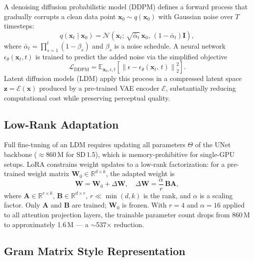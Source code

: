 \documentclass[conference]{IEEEtran}
\newcommand{\R}{\mathbb{R}}
\newcommand{\norm}[1]{\left\lVert#1\right\rVert}
\begin{document}
A denoising diffusion probabilistic model (DDPM) \cite{b17} defines a forward
process that gradually corrupts a clean data point $\mathbf{x}_0 \sim
q(\mathbf{x}_0)$ with Gaussian noise over $T$ timesteps:
\begin{equation}
  q(\mathbf{x}_t \mid \mathbf{x}_0) =
    \mathcal{N}\!\left(\mathbf{x}_t;\,\sqrt{\bar\alpha_t}\,\mathbf{x}_0,\,
    (1-\bar\alpha_t)\mathbf{I}\right),
  \label{eq:ddpm_forward}
\end{equation}
where $\bar\alpha_t = \prod_{s=1}^{t}(1-\beta_s)$ and $\beta_s$ is a
noise schedule. A neural network $\epsilon_\theta(\mathbf{x}_t, t)$ is
trained to predict the added noise via the simplified objective
\begin{equation}
  \mathcal{L}_{\text{DDPM}} =
    \mathbb{E}_{\mathbf{x}_0,\epsilon,t}\!\left[
      \norm{\epsilon - \epsilon_\theta(\mathbf{x}_t,\,t)}_2^2
    \right].
  \label{eq:ddpm_loss}
\end{equation}
Latent diffusion models (LDM) \cite{b7} apply this process in a compressed
latent space $\mathbf{z} = \mathcal{E}(\mathbf{x})$ produced by a pre-trained
VAE encoder $\mathcal{E}$, substantially reducing computational cost while
preserving perceptual quality.

\subsection{Low-Rank Adaptation}

Full fine-tuning of an LDM requires updating all parameters $\Theta$ of the
UNet backbone ($\approx$860\,M for SD\,1.5), which is memory-prohibitive for
single-GPU setups. LoRA \cite{b8} constrains weight updates to a
low-rank factorization: for a pre-trained weight matrix $\mathbf{W}_0 \in
\R^{d \times k}$, the adapted weight is
\begin{equation}
  \mathbf{W} = \mathbf{W}_0 + \Delta\mathbf{W},\quad
  \Delta\mathbf{W} = \frac{\alpha}{r}\,\mathbf{B}\mathbf{A},
  \label{eq:lora}
\end{equation}
where $\mathbf{A} \in \R^{r \times k}$, $\mathbf{B} \in \R^{d \times r}$,
$r \ll \min(d,k)$ is the rank, and $\alpha$ is a scaling factor.
Only $\mathbf{A}$ and $\mathbf{B}$ are trained; $\mathbf{W}_0$ is frozen.
With $r=4$ and $\alpha=16$ applied to all attention projection layers, the
trainable parameter count drops from 860\,M to approximately 1.6\,M —
a $\sim$537$\times$ reduction.

\subsection{Gram Matrix Style Representation}
\end{document}
